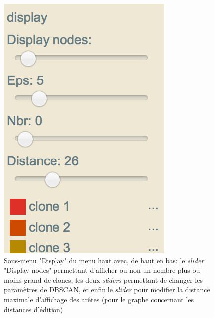 \documentclass[pdftex,12pt,a4paper]{report}
\begin{document}
\begin{spacing}{1.2}
\begin{figure}[H]
\begin{center}
	\includegraphics{img/Aff_menu_display.jpg}
\end{center}
\caption{Sous-menu "Display" du menu haut avec, de haut en bas: le \textit{slider} "Display nodes" permettant d'afficher ou non un nombre plus ou moins grand de clones, les deux \textit{sliders} permettant de changer les paramètres de DBSCAN, et enfin le \textit{slider} pour modifier la distance maximale d'affichage des arêtes (pour le graphe concernant les distances d'édition)}
\end{figure}


\end{spacing}
\end{document}
